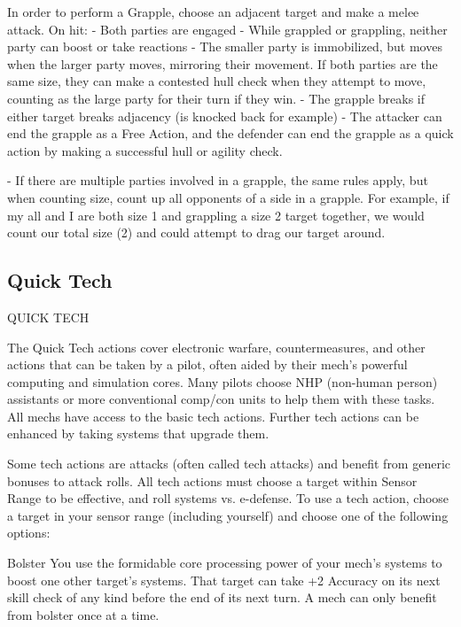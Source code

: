 In order to perform a Grapple, choose an adjacent target and make a melee attack. On hit:  
    -   Both parties are engaged  
    -   While grappled or grappling, neither party can boost or take reactions  
    -   The smaller party is immobilized, but moves when the larger party moves, mirroring their  
        movement. If both parties are the same size, they can make a contested hull check when  
        they attempt to move, counting as the large party for their turn if they win.  
    -   The grapple breaks if either target breaks adjacency (is knocked back for example)  
    -   The attacker can end the grapple as a Free Action, and the defender can end the grapple  
        as a quick action by making a successful hull or agility check.  

                                                                                                        


    -    If there are multiple parties involved in a grapple, the same rules apply, but when counting  
         size, count up all opponents of a side in a grapple. For example, if my all and I are both  
         size 1 and grappling a size 2 target together, we would count our total size (2) and could  
         attempt to drag our target around.   
\subsection{Quick Tech}

                                              QUICK TECH  

The Quick Tech actions cover electronic warfare, countermeasures, and other actions that can  
be taken by a pilot, often aided by their mech’s powerful computing and simulation cores. Many  
pilots choose NHP (non-human person) assistants or more conventional comp/con units to help  
them with these tasks. All mechs have access to the basic tech actions. Further tech actions can  
be enhanced by taking systems that upgrade them. 
 

Some tech actions are attacks (often called tech attacks) and benefit from generic bonuses to  
attack rolls. All tech actions must choose a target within Sensor Range to be effective, and roll  
systems vs. e-defense. To use a tech action, choose a target in your sensor range (including  
yourself) and choose one of the following options:
 

Bolster  
You use the formidable core processing power of your mech’s systems to boost one other  
target’s systems. That target can take +2 Accuracy on its next skill check of any kind before the  
end of its next turn. A mech can only benefit from bolster once at a time.
 

